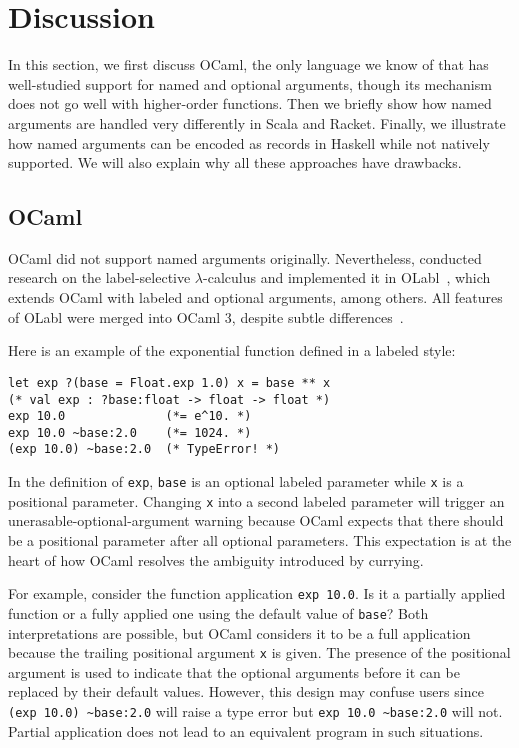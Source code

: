 \section{Discussion} \label{sec:related}

In this section, we first discuss OCaml, the only language we know of that has
well-studied support for named and optional arguments, though its mechanism does
not go well with higher-order functions. Then we briefly show how named
arguments are handled very differently in Scala and Racket. Finally, we
illustrate how named arguments can be encoded as records in Haskell while not
natively supported. We will also explain why all these approaches have
drawbacks.

\subsection{OCaml}

OCaml did not support named arguments originally. Nevertheless,
\citet{garrigue1994label} conducted research on the label-selective
$\lambda$-calculus and implemented it in OLabl~\citep{olabl}, which extends
OCaml with labeled and optional arguments, among others. All features of OLabl
were merged into OCaml 3, despite subtle
differences~\citep{garrigue2001labeled}.

Here is an example of the exponential function defined in a labeled style:

\begin{lstlisting}[language={[Objective]Caml}]
let exp ?(base = Float.exp 1.0) x = base ** x
(* val exp : ?base:float -> float -> float *)
exp 10.0              (*= e^10. *)
exp 10.0 ~base:2.0    (*= 1024. *)
(exp 10.0) ~base:2.0  (* TypeError! *)
\end{lstlisting}

\noindent In the definition of \lstinline{exp}, \lstinline{base} is an optional
labeled parameter while \lstinline{x} is a positional parameter. Changing
\lstinline{x} into a second labeled parameter will trigger an
unerasable-optional-argument warning because OCaml expects that there should be
a positional parameter after all optional parameters. This expectation is at the
heart of how OCaml resolves the ambiguity introduced by currying.

For example, consider the function application \lstinline{exp 10.0}. Is it a
partially applied function or a fully applied one using the default value of
\lstinline{base}? Both interpretations are possible, but OCaml considers it to
be a full application because the trailing positional argument \lstinline{x} is
given. The presence of the positional argument is used to indicate that the
optional arguments before it can be replaced by their default values. However,
this design may confuse users since \lstinline{(exp 10.0) ~base:2.0} will raise
a type error but \lstinline{exp 10.0 ~base:2.0} will not. Partial application
does not lead to an equivalent program in such situations.

